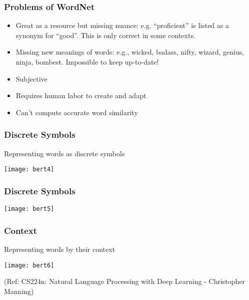 \begin{frame}[fragile]\frametitle{Problems of WordNet}


\begin{itemize}
\item Great as a resource but missing nuance: e.g. ``proficient'' is listed as a synonym for ``good''.  This is only correct in some contexts.
\item Missing new meanings of words: e.g., wicked, badass, nifty, wizard, genius, ninja, bombest. Impossible to keep up-to-date!
\item Subjective
\item Requires human labor to create and adapt
\item Can't compute accurate word similarity 
\end{itemize}


\end{frame}

\begin{frame}[fragile]\frametitle{Discrete Symbols}

Representing words as discrete symbols

\begin{center}
\texttt{[image: bert4]}
\end{center}		  



\end{frame}

\begin{frame}[fragile]\frametitle{Discrete Symbols}


\begin{center}
\texttt{[image: bert5]}
\end{center}		  



\end{frame}

\begin{frame}[fragile]\frametitle{Context}

Representing words by their context

\begin{center}
\texttt{[image: bert6]}
\end{center}		  


{\tiny (Ref: CS224n: Natural Language Processing with Deep Learning - Christopher Manning)}

\end{frame}

